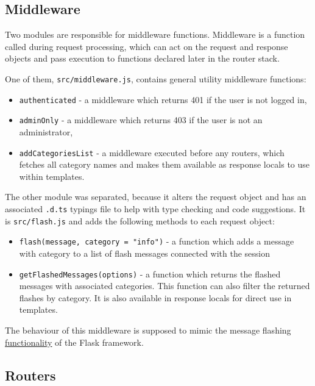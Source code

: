 \subsection{Middleware}

Two modules are responsible for middleware functions. Middleware is a function called during request processing, which can act on the request and response objects and pass execution to functions declared later in the router stack.

One of them, \texttt{src/middleware.js}, contains general utility middleware functions:

\begin{itemize}
    \item \texttt{authenticated} - a middleware which returns 401 if the user is not logged in,
    \item \texttt{adminOnly} - a middleware which returns 403 if the user is not an administrator,
    \item \texttt{addCategoriesList} - a middleware executed before any routers, which fetches all category names and makes them available as response locals to use within templates.
\end{itemize}

The other module was separated, because it alters the request object and has an associated \texttt{.d.ts} typings file to help with type checking and code suggestions. It is \texttt{src/flash.js} and adds the following methods to each request object:

\begin{itemize}
    \item \texttt{flash(message, category = "info")} - a function which adds a message with category to a list of flash messages connected with the session
    \item \texttt{getFlashedMessages(options)} - a function which returns the flashed messages with associated categories. This function can also filter the returned flashes by category. It is also available in response locals for direct use in templates.
\end{itemize}

The behaviour of this middleware is supposed to mimic the message flashing \href{https://flask.palletsprojects.com/en/2.2.x/quickstart/#message-flashing}{functionality} of the Flask framework.

\subsection{Routers}

